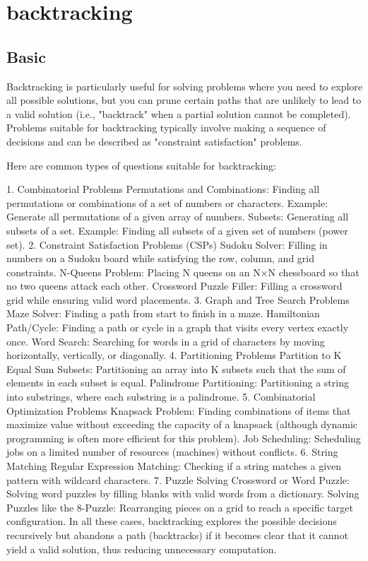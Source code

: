 \documentclass[a4paper,11pt,twoside]{book}
\begin{document}
\section{backtracking}
\subsection{Basic}

	Backtracking is particularly useful for solving problems where you need to explore all possible solutions, but you can prune certain paths that are unlikely to lead to a valid solution (i.e., "backtrack" when a partial solution cannot be completed). Problems suitable for backtracking typically involve making a sequence of decisions and can be described as "constraint satisfaction" problems.

Here are common types of questions suitable for backtracking:

1. Combinatorial Problems
Permutations and Combinations: Finding all permutations or combinations of a set of numbers or characters.
Example: Generate all permutations of a given array of numbers.
Subsets: Generating all subsets of a set.
Example: Finding all subsets of a given set of numbers (power set).
2. Constraint Satisfaction Problems (CSPs)
Sudoku Solver: Filling in numbers on a Sudoku board while satisfying the row, column, and grid constraints.
N-Queens Problem: Placing N queens on an N×N chessboard so that no two queens attack each other.
Crossword Puzzle Filler: Filling a crossword grid while ensuring valid word placements.
3. Graph and Tree Search Problems
Maze Solver: Finding a path from start to finish in a maze.
Hamiltonian Path/Cycle: Finding a path or cycle in a graph that visits every vertex exactly once.
Word Search: Searching for words in a grid of characters by moving horizontally, vertically, or diagonally.
4. Partitioning Problems
Partition to K Equal Sum Subsets: Partitioning an array into K subsets such that the sum of elements in each subset is equal.
Palindrome Partitioning: Partitioning a string into substrings, where each substring is a palindrome.
5. Combinatorial Optimization Problems
Knapsack Problem: Finding combinations of items that maximize value without exceeding the capacity of a knapsack (although dynamic programming is often more efficient for this problem).
Job Scheduling: Scheduling jobs on a limited number of resources (machines) without conflicts.
6. String Matching
Regular Expression Matching: Checking if a string matches a given pattern with wildcard characters.
7. Puzzle Solving
Crossword or Word Puzzle: Solving word puzzles by filling blanks with valid words from a dictionary.
Solving Puzzles like the 8-Puzzle: Rearranging pieces on a grid to reach a specific target configuration.
In all these cases, backtracking explores the possible decisions recursively but abandons a path (backtracks) if it becomes clear that it cannot yield a valid solution, thus reducing unnecessary computation.
\end{document}
